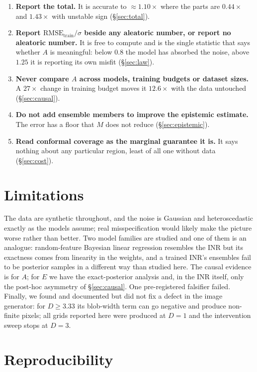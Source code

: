 \documentclass[10pt]{article}
\begin{document}
\begin{enumerate}
\item \textbf{Report the total.} It is accurate to $\approx 1.10\times$ where the parts are
$0.44\times$ and $1.43\times$ with unstable sign (\S\ref{sec:total}).
\item \textbf{Report $\mathrm{RMSE}_{\mathrm{train}}/\sigma$ beside any aleatoric number, or
report no aleatoric number.} It is free to compute and is the single statistic that says
whether $A$ is meaningful: below $0.8$ the model has absorbed the noise, above $1.25$ it is
reporting its own misfit (\S\ref{sec:law}).
\item \textbf{Never compare $A$ across models, training budgets or dataset sizes.} A
$27\times$ change in training budget moves it $12.6\times$ with the data untouched
(\S\ref{sec:causal}).
\item \textbf{Do not add ensemble members to improve the epistemic estimate.} The error has a
floor that $M$ does not reduce (\S\ref{sec:epistemic}).
\item \textbf{Read conformal coverage as the marginal guarantee it is.} It says nothing about
any particular region, least of all one without data (\S\ref{sec:cost}).
\end{enumerate}

\section{Limitations}

The data are synthetic throughout, and the noise is Gaussian and heteroscedastic exactly as
the models assume; real misspecification would likely make the picture worse rather than
better. Two model families are studied and one of them is an analogue: random-feature
Bayesian linear regression resembles the INR but its exactness comes from linearity in the
weights, and a trained INR's ensembles fail to be posterior samples in a different way than
studied here. The causal evidence is for $A$; for $E$ we have the exact-posterior analysis
and, in the INR itself, only the post-hoc asymmetry of \S\ref{sec:causal}. One pre-registered
falsifier failed. Finally, we found and documented but did not fix a defect in the image
generator: for $D \geq 3.33$ its blob-width term can go negative and produce non-finite
pixels; all grids reported here were produced at $D=1$ and the intervention sweep stops at
$D=3$.

\section*{Reproducibility}
\end{document}
